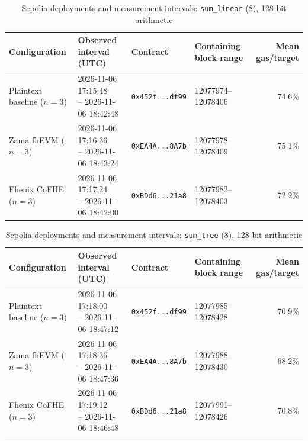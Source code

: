 \begin{table}[!t]
\caption{Sepolia deployments and measurement intervals: \texttt{sum\_linear} (8), 128-bit arithmetic}
\label{tab:sepolia-experiment-deployments-circuits-euint128-circuits-w128-sum-linear-n8}
\centering
\footnotesize
\setlength{\tabcolsep}{4pt}
\begin{tabular}{|l|l|l|l|r|}
\hline
\textbf{Configuration} &
\textbf{Observed interval (UTC)} &
\textbf{Contract} &
\textbf{Containing block range} &
\textbf{Mean gas/target} \\
\hline
Plaintext baseline (\(n=3\)) &
\shortstack[l]{2026-11-06 17:15:48 \\ -- 2026-11-06 18:42:48} &
\texttt{0x452f...df99} &
12077974--12078406 &
74.6\% \\
\hline
Zama fhEVM (\(n=3\)) &
\shortstack[l]{2026-11-06 17:16:36 \\ -- 2026-11-06 18:43:24} &
\texttt{0xEA4A...8A7b} &
12077978--12078409 &
75.1\% \\
\hline
Fhenix CoFHE (\(n=3\)) &
\shortstack[l]{2026-11-06 17:17:24 \\ -- 2026-11-06 18:42:00} &
\texttt{0xBDd6...21a8} &
12077982--12078403 &
72.2\% \\
\hline
\end{tabular}
\end{table}

\begin{table}[!t]
\caption{Sepolia deployments and measurement intervals: \texttt{sum\_tree} (8), 128-bit arithmetic}
\label{tab:sepolia-experiment-deployments-circuits-euint128-circuits-w128-sum-tree-n8}
\centering
\footnotesize
\setlength{\tabcolsep}{4pt}
\begin{tabular}{|l|l|l|l|r|}
\hline
\textbf{Configuration} &
\textbf{Observed interval (UTC)} &
\textbf{Contract} &
\textbf{Containing block range} &
\textbf{Mean gas/target} \\
\hline
Plaintext baseline (\(n=3\)) &
\shortstack[l]{2026-11-06 17:18:00 \\ -- 2026-11-06 18:47:12} &
\texttt{0x452f...df99} &
12077985--12078428 &
70.9\% \\
\hline
Zama fhEVM (\(n=3\)) &
\shortstack[l]{2026-11-06 17:18:36 \\ -- 2026-11-06 18:47:36} &
\texttt{0xEA4A...8A7b} &
12077988--12078430 &
68.2\% \\
\hline
Fhenix CoFHE (\(n=3\)) &
\shortstack[l]{2026-11-06 17:19:12 \\ -- 2026-11-06 18:46:48} &
\texttt{0xBDd6...21a8} &
12077991--12078426 &
70.8\% \\
\hline
\end{tabular}
\end{table}

